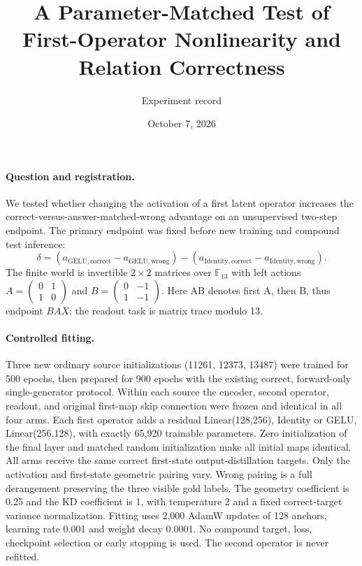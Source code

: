 \documentclass[11pt]{article}
\title{A Parameter-Matched Test of First-Operator Nonlinearity and Relation Correctness}
\author{Experiment record}
\date{October 7, 2026}
\begin{document}
\maketitle
\paragraph{Question and registration.}
We tested whether changing the activation of a first latent operator increases the correct-versus-answer-matched-wrong advantage on an unsupervised two-step endpoint. The primary endpoint was fixed before new training and compound test inference:
\[
\delta=(a_{\mathrm{GELU,correct}}-a_{\mathrm{GELU,wrong}})
       -(a_{\mathrm{Identity,correct}}-a_{\mathrm{Identity,wrong}}).
\]
The finite world is invertible $2\times2$ matrices over $\mathbb F_{13}$ with left actions $A=\left(\begin{smallmatrix}0&1\\1&0\end{smallmatrix}\right)$ and $B=\left(\begin{smallmatrix}0&-1\\1&-1\end{smallmatrix}\right)$. Here AB denotes first A, then B, thus endpoint $BAX$; the readout task is matrix trace modulo 13.
\paragraph{Controlled fitting.}
Three new ordinary source initializations (11261, 12373, 13487) were trained for 500 epochs, then prepared for 900 epochs with the existing correct, forward-only single-generator protocol. Within each source the encoder, second operator, readout, and original first-map skip connection were frozen and identical in all four arms. Each first operator adds a residual Linear(128,256), Identity or GELU, Linear(256,128), with exactly 65,920 trainable parameters. Zero initialization of the final layer and matched random initialization make all initial maps identical. All arms receive the same correct first-state output-distillation targets. Only the activation and first-state geometric pairing vary. Wrong pairing is a full derangement preserving the three visible gold labels. The geometry coefficient is 0.25 and the KD coefficient is 1, with temperature 2 and a fixed correct-target variance normalization. Fitting uses 2,000 AdamW updates of 128 anchors, learning rate 0.001 and weight decay 0.0001. No compound target, loss, checkpoint selection or early stopping is used. The second operator is never refitted.
\end{document}
